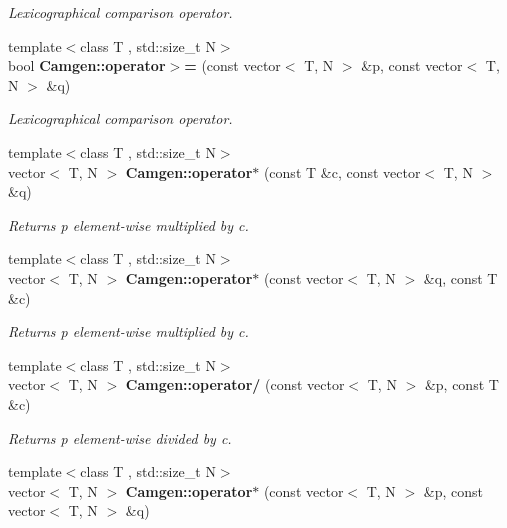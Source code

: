 \begin{DoxyCompactItemize}
\begin{DoxyCompactList}\small\item\em Lexicographical comparison operator. \end{DoxyCompactList}\item 
\hypertarget{a00849_a26880344a337cf3283b1ecb16a8cdea4}{{\footnotesize template$<$class T , std\-::size\-\_\-t N$>$ }\\bool {\bfseries Camgen\-::operator$>$=} (const vector$<$ T, N $>$ \&p, const vector$<$ T, N $>$ \&q)}\label{a00849_a26880344a337cf3283b1ecb16a8cdea4}

\begin{DoxyCompactList}\small\item\em Lexicographical comparison operator. \end{DoxyCompactList}\item 
\hypertarget{a00849_a3fa8c46e04e26a30e4de4ac14c828aed}{{\footnotesize template$<$class T , std\-::size\-\_\-t N$>$ }\\vector$<$ T, N $>$ {\bfseries Camgen\-::operator$\ast$} (const T \&c, const vector$<$ T, N $>$ \&q)}\label{a00849_a3fa8c46e04e26a30e4de4ac14c828aed}

\begin{DoxyCompactList}\small\item\em Returns p element-\/wise multiplied by c. \end{DoxyCompactList}\item 
\hypertarget{a00849_afc7e09f0670848937d884430efdd3635}{{\footnotesize template$<$class T , std\-::size\-\_\-t N$>$ }\\vector$<$ T, N $>$ {\bfseries Camgen\-::operator$\ast$} (const vector$<$ T, N $>$ \&q, const T \&c)}\label{a00849_afc7e09f0670848937d884430efdd3635}

\begin{DoxyCompactList}\small\item\em Returns p element-\/wise multiplied by c. \end{DoxyCompactList}\item 
\hypertarget{a00849_ae413da0d4c6b933c8350f423f3a1ebc4}{{\footnotesize template$<$class T , std\-::size\-\_\-t N$>$ }\\vector$<$ T, N $>$ {\bfseries Camgen\-::operator/} (const vector$<$ T, N $>$ \&p, const T \&c)}\label{a00849_ae413da0d4c6b933c8350f423f3a1ebc4}

\begin{DoxyCompactList}\small\item\em Returns p element-\/wise divided by c. \end{DoxyCompactList}\item 
\hypertarget{a00849_a321558dbfe6bba2978471377d0627cc0}{{\footnotesize template$<$class T , std\-::size\-\_\-t N$>$ }\\vector$<$ T, N $>$ {\bfseries Camgen\-::operator$\ast$} (const vector$<$ T, N $>$ \&p, const vector$<$ T, N $>$ \&q)}\label{a00849_a321558dbfe6bba2978471377d0627cc0}


\end{DoxyCompactItemize}
